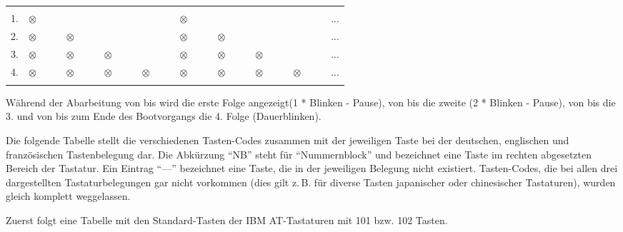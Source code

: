   {\def\led{\begin{math}\otimes\quad\quad\end{math}}
  \begin{tabular}{c l l l l l l l l l}
    \quad\\
    1. & \led & & & & \led & & & & ... \\ 
    2. & \led & \led & & & \led & \led & & & ... \\ 
    3. & \led & \led & \led & & \led & \led & \led & & ... \\ 
    4. & \led & \led & \led & \led & \led & \led & \led & \led & ... \\ 
    \quad 
  \end{tabular}}

  Während der Abarbeitung von   bis  
  wird die erste Folge angezeigt\newline(1 * Blinken - Pause),\newline
  von  bis  die zweite (2 * Blinken - Pause),\newline
  von  bis  die 3. und \newline
  von  bis zum Ende des Bootvorgangs die 4. Folge (Dauerblinken).
    

Die folgende Tabelle stellt die verschiedenen Tasten-Codes zusammen mit der
jeweiligen Taste bei der deutschen, englischen und französischen Tastenbelegung
dar. Die Abkürzung ``NB'' steht für ``Nummernblock'' und bezeichnet eine Taste
im rechten abgesetzten Bereich der Tastatur. Ein Eintrag ``---'' bezeichnet eine
Taste, die in der jeweiligen Belegung nicht existiert. Tasten-Codes, die bei
allen drei dargestellten Tastaturbelegungen gar nicht vorkommen (dies gilt
z.\,B. für diverse Tasten japanischer oder chinesischer Tastaturen), wurden
gleich komplett weggelassen.

Zuerst folgt eine Tabelle mit den Standard-Tasten der IBM AT-Tastaturen mit 101
bzw. 102 Tasten.

\newcommand\twoheaduparrow{\mathrel{\rotatebox[origin=c]{90}{$\twoheadrightarrow$}}}
\newcommand\twoheaddownarrow{\mathrel{\rotatebox[origin=c]{270}{$\twoheadrightarrow$}}}

